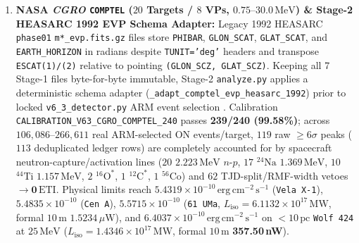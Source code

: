 \documentclass[twocolumn,10pt]{article}
\begin{document}
\begin{enumerate}
  \item \textbf{NASA \textit{CGRO} \texttt{COMPTEL} ($20$ Targets / $8$ VPs, $0.75\text{--}30.0\,\mathrm{MeV}$) \& Stage-2 HEASARC 1992 EVP Schema Adapter:} Legacy 1992 HEASARC \texttt{phase01} \texttt{m*\_evp.fits.gz} files store \texttt{PHIBAR}, \texttt{GLON\_SCAT}, \texttt{GLAT\_SCAT}, and \texttt{EARTH\_HORIZON} in radians despite \texttt{TUNIT='deg'} headers and transpose \texttt{ESCAT(1)/(2)} relative to pointing \texttt{(GLON\_SCZ, GLAT\_SCZ)}. Keeping all 7 Stage-1 files byte-for-byte immutable, Stage-2 \texttt{analyze.py} applies a deterministic schema adapter (\texttt{\_adapt\_comptel\_evp\_heasarc\_1992}) prior to locked \texttt{v6\_3\_detector.py} ARM event selection \cite{Schonfelder1993}. Calibration \texttt{CALIBRATION\_V63\_CGRO\_COMPTEL\_240} passes \textbf{239/240 (99.58\%)}; across $106{,}086\text{--}266{,}611$ real ARM-selected ON events/target, $119$ raw $\ge 6\sigma$ peaks ($113$ deduplicated ledger rows) are completely accounted for by spacecraft neutron-capture/activation lines ($20$ $2.223\,\mathrm{MeV}$ $n$-$p$, $17$ $^{24}\mathrm{Na}$ $1.369\,\mathrm{MeV}$, $10$ $^{44}\mathrm{Ti}$ $1.157\,\mathrm{MeV}$, $2$ $^{16}\mathrm{O}^\ast$, $1$ $^{12}\mathrm{C}^\ast$, $1$ $^{56}\mathrm{Co}$) and $62$ TJD-split/RMF-width vetoes $\rightarrow \mathbf{0\,\mathrm{ETI}}$. Physical limits reach \textbf{$5.4319\times 10^{-10}\,\mathrm{erg\,cm^{-2}\,s^{-1}}$} (\texttt{Vela\,X-1}), \textbf{$5.4835\times 10^{-10}$} (\texttt{Cen\,A}), \textbf{$5.5715\times 10^{-10}$} (\texttt{61\,UMa}, $L_{\mathrm{iso}} = 6.1132\times 10^{17}\,\mathrm{MW}$, formal $10\,\text{m}$ $1.5234\,\mu\text{W}$), and \textbf{$6.4037\times 10^{-10}\,\mathrm{erg\,cm^{-2}\,s^{-1}}$} on $<10\,\text{pc}$ \texttt{Wolf\,424} at $25\,\mathrm{MeV}$ ($L_{\mathrm{iso}} = 1.4346\times 10^{17}\,\mathrm{MW}$, formal $10\,\text{m}$ \textbf{357.50\,nW}).

\end{enumerate}
\end{document}
